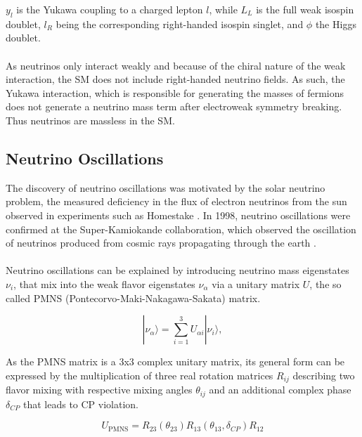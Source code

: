 \documentclass[a4paper,12pt,numbered]{article}
\begin{document}
$y_l$ is the Yukawa coupling to a charged lepton $l$, while $L_L$ is the full weak isospin doublet, $l_R$ being the corresponding right-handed isospin singlet, and $\phi$ the Higgs doublet. 
\\ \\
As neutrinos only interact weakly and because of the chiral nature of the weak interaction, the SM does not include right-handed neutrino fields. As such, the Yukawa interaction, which is responsible for generating the masses of fermions does not generate a neutrino mass term after electroweak symmetry breaking. Thus neutrinos are massless in the SM.

\subsection{Neutrino Oscillations}

The discovery of neutrino oscillations was motivated by the solar neutrino problem, the measured deficiency in the flux of electron neutrinos from the sun observed in experiments such as Homestake \cite{solneu_history}. In 1998, neutrino oscillations were confirmed at the Super-Kamiokande collaboration, which observed the oscillation of neutrinos produced from cosmic rays propagating through the earth \cite{kamiokande_discovery}.
\\ \\
Neutrino oscillations can be explained by introducing neutrino mass eigenstates $\nu_i$, that mix into the weak flavor eigenstates $\nu_\alpha$ via a unitary matrix $U$, the so called  PMNS (Pontecorvo-Maki-Nakagawa-Sakata) matrix. 

\begin{equation}
    |\nu_\alpha\rangle = \sum_{i=1}^{3} U_{\alpha i} |\nu_i\rangle,
\end{equation}

As the PMNS matrix is a 3x3 complex unitary matrix, its general form can be expressed by the multiplication of three real rotation matrices $R_{ij}$ describing two flavor mixing with respective mixing angles $\theta_{ij}$ and an additional complex phase $\delta_{CP}$ that leads to CP violation.

\begin{equation}
    U_{\text{PMNS}} = R_{23}(\theta_{23}) R_{13}(\theta_{13}, \delta_{CP}) R_{12}
\end{equation}
\end{document}
